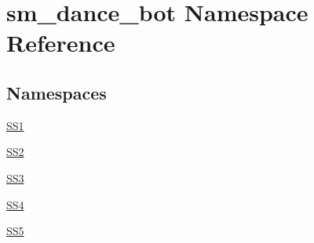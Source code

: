 \hypertarget{namespacesm__dance__bot}{}\section{sm\+\_\+dance\+\_\+bot Namespace Reference}
\label{namespacesm__dance__bot}
\subsection*{Namespaces}
\begin{DoxyCompactItemize}
\item 
 \hyperlink{namespacesm__dance__bot_1_1SS1}{S\+S1}
\item 
 \hyperlink{namespacesm__dance__bot_1_1SS2}{S\+S2}
\item 
 \hyperlink{namespacesm__dance__bot_1_1SS3}{S\+S3}
\item 
 \hyperlink{namespacesm__dance__bot_1_1SS4}{S\+S4}
\item 
 \hyperlink{namespacesm__dance__bot_1_1SS5}{S\+S5}
\end{DoxyCompactItemize}

